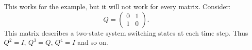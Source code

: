 \documentclass[12pt]{article}
\begin{document}
This works for the example, but it will not work for every matrix.
Consider:
\[
    Q =
    \begin{pmatrix}
        0 & 1 \\
        1 & 0
    \end{pmatrix}
    .
\] This matrix describes a two-state system switching states at each
time step.  Thus \( Q^2 = I \), \( Q^3=Q \), \( Q^4=I \) and so on.




\end{document}
